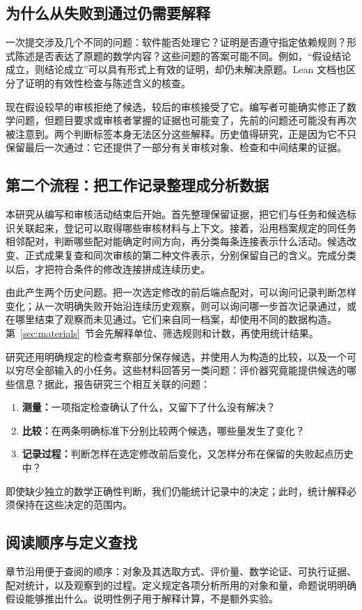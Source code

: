 \subsection{为什么从失败到通过仍需要解释}
一次提交涉及几个不同的问题：软件能否处理它？证明是否遵守指定依赖规则？形式陈述是否表达了原题的数学内容？这些问题的答案可能不同。例如，“假设结论成立，则结论成立”可以具有形式上有效的证明，却仍未解决原题。Lean 文档也区分了证明的有效性检查与陈述含义的核查\cite{leanvalidation}。

现在假设较早的审核拒绝了候选，较后的审核接受了它。编写者可能确实修正了数学问题，但题目要求或审核者掌握的证据也可能变了，先前的问题还可能没有再次被注意到。两个判断标签本身无法区分这些解释。历史值得研究，正是因为它不只保留最后一次通过：它还提供了一部分有关审核对象、检查和中间结果的证据。

\subsection{第二个流程：把工作记录整理成分析数据}
\label{subsec:analysis-workflow}
本研究从编写和审核活动结束后开始。首先整理保留证据，把它们与任务和候选标识关联起来，登记可以取得哪些审核材料与上下文。接着，沿用档案规定的同任务相邻配对，判断哪些配对能确定时间方向，再分类每条连接表示什么活动。候选改变、正式成果复查和同次审核的第二种文件表示，分别保留自己的含义。完成分类以后，才把符合条件的修改连接拼成连续历史。

由此产生两个历史问题。把一次选定修改的前后端点配对，可以询问记录判断怎样变化；从一次明确失败开始沿连续历史观察，则可以询问哪一步首次记录通过，或在哪里结束了观察而未见通过。它们来自同一档案，却使用不同的数据构造。第~\ref{sec:materials}~节会先解释单位、筛选规则和计数，再使用统计结果。

研究还用明确规定的检查考察部分保存候选，并使用人为构造的比较，以及一个可以穷尽全部输入的小任务。这些材料回答另一类问题：评价器究竟能提供候选的哪些信息？据此，报告研究三个相互关联的问题：
\begin{enumerate}[leftmargin=*]
\item \textbf{测量：}一项指定检查确认了什么，又留下了什么没有解决？
\item \textbf{比较：}在两条明确标准下分别比较两个候选，哪些量发生了变化？
\item \textbf{记录过程：}判断怎样在选定修改前后变化，又怎样分布在保留的失败起点历史中？
\end{enumerate}
即使缺少独立的数学正确性判断，我们仍能统计记录中的决定；此时，统计解释必须保持在这些决定的范围内。

\subsection{阅读顺序与定义查找}
章节沿用便于查阅的顺序：对象及其选取方式、评价量、数学论证、可执行证据、配对统计，以及观察到的过程。定义规定各项分析所用的对象和量，命题说明明确假设能够推出什么。说明性例子用于解释计算，不是额外实验。

